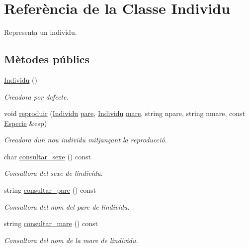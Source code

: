 \hypertarget{class_individu}{}\section{Referència de la Classe Individu}
\label{class_individu}


Representa un individu.  


\subsection*{Mètodes públics}
\begin{DoxyCompactItemize}
\item 
\hyperlink{class_individu_ac35091404cfbf11946694806aefa9e7e}{Individu} ()
\begin{DoxyCompactList}\small\item\em Creadora por defecte. \end{DoxyCompactList}\item 
void \hyperlink{class_individu_a38c1693172190ae30f0577a3d5459b94}{reproduir} (\hyperlink{class_individu}{Individu} \hyperlink{class_individu_acd37349b1c7db6e07cd88eade7c622c0}{pare}, \hyperlink{class_individu}{Individu} \hyperlink{class_individu_ae64702bb96cec3867674fb52d6a310e7}{mare}, string npare, string nmare, const \hyperlink{class_especie}{Especie} \&esp)
\begin{DoxyCompactList}\small\item\em Creadora d\textquotesingle{}un nou individu mitjançant la reproducció. \end{DoxyCompactList}\item 
char \hyperlink{class_individu_a06f4e5e857afbbcf9599d04c54a4f3a1}{consultar\+\_\+sexe} () const 
\begin{DoxyCompactList}\small\item\em Consultora del sexe de l\textquotesingle{}individu. \end{DoxyCompactList}\item 
string \hyperlink{class_individu_a0807da1b89bb753f7bb92e1c39cefa44}{consultar\+\_\+pare} () const 
\begin{DoxyCompactList}\small\item\em Consultora del nom del pare de l\textquotesingle{}individu. \end{DoxyCompactList}\item 
string \hyperlink{class_individu_a46a9823e9287c90d0ad58d494317ea65}{consultar\+\_\+mare} () const 
\begin{DoxyCompactList}\small\item\em Consultora del nom de la mare de l\textquotesingle{}individu. \end{DoxyCompactList}\item 

\end{DoxyCompactItemize}

